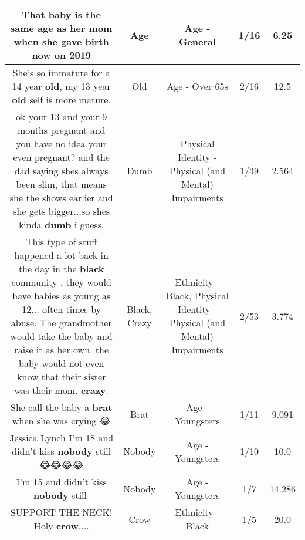 \documentclass[11pt]{article}
\newlength\mylength
\begin{document}
\begin{center}
\begin{longtable}{|C{.65\mylength}|C{.30\mylength}|C{.12\mylength}|C{.12\mylength}|C{.12\mylength}|}
  \small That baby is the same \textbf{age} as her mom when she gave birth now on 2019\normalsize   & Age & Age - General & 1/16 & 6.25 \\  \hline
  \small She's so immature for a 14 year \textbf{old}, my 13 year \textbf{old} self is more mature.\normalsize   & Old & Age - Over 65s & 2/16 & 12.5 \\  \hline
  \small ok your 13 and your 9 months pregnant and you have no idea your even pregnant? and the dad saying shes always been slim, that means she the shows earlier and she gets bigger...so shes kinda \textbf{dumb} i guess.\normalsize   & Dumb & Physical Identity - Physical (and Mental) Impairments & 1/39 & 2.564 \\  \hline
  \small This type of stuff happened a lot back in the day in the \textbf{black} community . they would have babies as young as 12... often times by abuse. The grandmother would take the baby and raise it as her own. the baby would not even know that their sister was their mom. \textbf{crazy}.\normalsize   & Black, Crazy & Ethnicity - Black, Physical Identity - Physical (and Mental) Impairments & 2/53 & 3.774 \\  \hline
  \small She call the baby a \textbf{brat} when she was crying 😂\normalsize   & Brat & Age - Youngsters & 1/11 & 9.091 \\  \hline
  \small Jessica Lynch I'm 18 and didn't kiss \textbf{nobody} still 😂😂😂😂\normalsize   & Nobody & Age - Youngsters & 1/10 & 10.0 \\  \hline
  \small I'm 15 and didn't kiss \textbf{nobody}  still🤣\normalsize   & Nobody & Age - Youngsters & 1/7 & 14.286 \\  \hline
  \small SUPPORT THE NECK! Holy \textbf{crow}....\normalsize   & Crow & Ethnicity - Black & 1/5 & 20.0 \\  \hline

\end{longtable}
\end{center}
\end{document}
